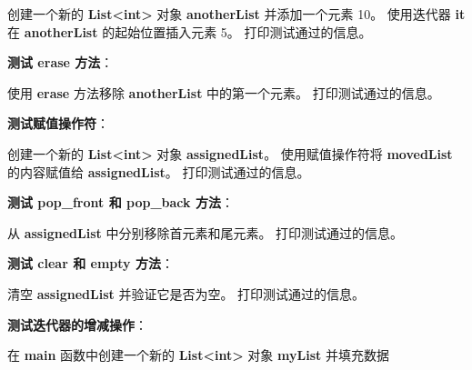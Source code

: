 创建一个新的 \textbf{List<int>} 对象 \textbf{anotherList} 并添加一个元素 10。
使用迭代器 \textbf{it} 在 \textbf{anotherList} 的起始位置插入元素 5。
打印测试通过的信息。

\textbf{测试 erase 方法}：

使用 \textbf{erase} 方法移除 \textbf{anotherList} 中的第一个元素。
打印测试通过的信息。

\textbf{测试赋值操作符}：

创建一个新的 \textbf{List<int>} 对象 \textbf{assignedList}。
使用赋值操作符将 \textbf{movedList} 的内容赋值给 \textbf{assignedList}。
打印测试通过的信息。

\textbf{测试 pop\_front 和 pop\_back 方法}：

从 \textbf{assignedList} 中分别移除首元素和尾元素。
打印测试通过的信息。

\textbf{测试 clear 和 empty 方法}：

清空 \textbf{assignedList} 并验证它是否为空。
打印测试通过的信息。

\textbf{测试迭代器的增减操作}：

在 \textbf{main} 函数中创建一个新的 \textbf{List<int>} 对象 \textbf{myList} 并填充数据